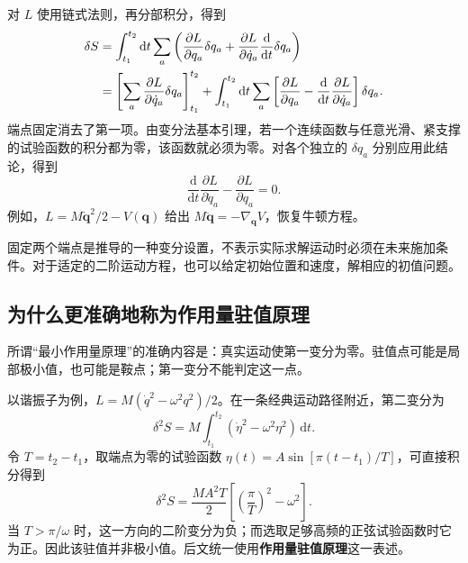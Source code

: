 对 $L$ 使用链式法则，再分部积分，得到
\begin{align}
  \delta S
  &=\int_{t_{1}}^{t_{2}}\mathrm{d}t\sum_{a}
    \left(\frac{\partial L}{\partial q_{a}}\delta q_{a}
    +\frac{\partial L}{\partial\dot q_{a}}\frac{\mathrm{d}}{\mathrm{d}t}\delta q_{a}\right)
    \notag\\
  &=\left[\sum_{a}\frac{\partial L}{\partial\dot q_{a}}\delta q_{a}\right]_{t_{1}}^{t_{2}}
    +\int_{t_{1}}^{t_{2}}\mathrm{d}t\sum_{a}
    \left[\frac{\partial L}{\partial q_{a}}
    -\frac{\mathrm{d}}{\mathrm{d}t}\frac{\partial L}{\partial\dot q_{a}}\right]\delta q_{a}.
\end{align}
端点固定消去了第一项。由变分法基本引理，若一个连续函数与任意光滑、紧支撑的试验函数的积分都为零，该函数就必须为零。对各个独立的 $\delta q_{a}$ 分别应用此结论，得到
\begin{equation}
  \boxed{\frac{\mathrm{d}}{\mathrm{d}t}\frac{\partial L}{\partial\dot q_{a}}
  -\frac{\partial L}{\partial q_{a}}=0.}
  \label{eq:prelude-particle-el}
\end{equation}
例如，$L=M\dot{\bm{q}}^{2}/2-V(\bm{q})$ 给出
$M\ddot{\bm{q}}=-\nabla_{\bm{q}}V$，恢复牛顿方程。

固定两个端点是推导的一种变分设置，不表示实际求解运动时必须在未来施加条件。对于适定的二阶运动方程，也可以给定初始位置和速度，解相应的初值问题。

\subsection{为什么更准确地称为作用量驻值原理}

所谓“最小作用量原理”的准确内容是：真实运动使第一变分为零。驻值点可能是局部极小值，也可能是鞍点；第一变分不能判定这一点。

以谐振子为例，$L=M(\dot q^{2}-\omega^{2}q^{2})/2$。在一条经典运动路径附近，第二变分为
\begin{equation}
  \delta^{2}S=M\int_{t_{1}}^{t_{2}}
  \left(\dot\eta^{2}-\omega^{2}\eta^{2}\right)\,\mathrm{d}t.
\end{equation}
令 $T=t_{2}-t_{1}$，取端点为零的试验函数
$\eta(t)=A\sin[\pi(t-t_{1})/T]$，可直接积分得到
\begin{equation}
  \delta^{2}S=\frac{MA^{2}T}{2}
  \left[\left(\frac{\pi}{T}\right)^{2}-\omega^{2}\right].
\end{equation}
当 $T>\pi/\omega$ 时，这一方向的二阶变分为负；而选取足够高频的正弦试验函数时它为正。因此该驻值并非极小值。后文统一使用\textbf{作用量驻值原理}这一表述。

